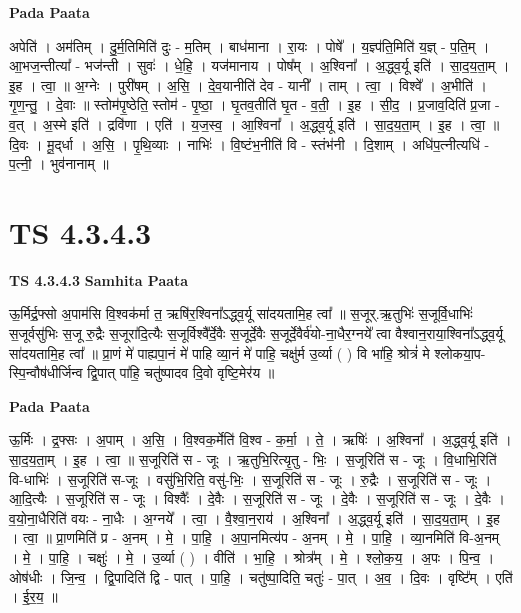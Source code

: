 \documentclass[17pt]{extarticle}
\begin{document}
\textbf{Pada Paata} \newline

अपेति॑ । अम॑तिम् । दु॒र्म॒तिमिति॑ दुः - म॒तिम् । बाध॑माना । रा॒यः । पोषे᳚ । य॒ज्ञ्प॑ति॒मिति॑ य॒ज्ञ् - प॒ति॒म् । आ॒भज॒न्तीत्या᳚ - भज॑न्ती । सुवः॑ । धे॒हि॒ । यज॑मानाय । पोष᳚म् । अ॒श्विना᳚ । अ॒द्ध्व॒र्यू इति॑ । सा॒द॒य॒ता॒म् । इ॒ह । त्वा॒ ॥ अ॒ग्नेः । पुरी॑षम् । अ॒सि॒ । दे॒व॒यानीति॑ देव - यानी᳚ । ताम् । त्वा॒ । विश्वे᳚ । अ॒भीति॑ । गृ॒ण॒न्तु॒ । दे॒वाः ॥ स्तोम॑पृ॒ष्ठेति॒ स्तोम॑ - पृ॒ष्ठा॒ । घृ॒तव॒तीति॑ घृ॒त - व॒ती॒ । इ॒ह । सी॒द॒ । प्र॒जाव॒दिति॑ प्र॒जा - व॒त् । अ॒स्मे इति॑ । द्रवि॑णा । एति॑ । य॒ज॒स्व॒ । आ॒श्विना᳚ । अ॒द्ध्व॒र्यू इति॑ । सा॒द॒य॒ता॒म् । इ॒ह । त्वा॒ ॥ दि॒वः । मू॒द्‌र्धा । अ॒सि॒ । पृ॒थि॒व्याः । नाभिः॑ । वि॒ष्टंभ॒नीति॑ वि - स्तंभ॑नी । दि॒शाम् । अधि॑प॒त्नीत्यधि॑ - प॒त्नी॒ । भुव॑नानाम् ॥  \newline




\section*{ TS 4.3.4.3 }

\textbf{TS 4.3.4.3 } \newline
\textbf{Samhita Paata} \newline

ऊ॒र्मिर्द्र॒फ्सो अ॒पाम॑सि वि॒श्वक॑र्मा त॒ ऋषि॑र॒श्विना᳚ऽद्ध्व॒र्यू सा॑दयतामि॒ह त्वा᳚ ॥ स॒जूर्.ऋ॒तुभिः॑ स॒जूर्वि॒धाभिः॑ स॒जूर्वसु॑भिः स॒जू रु॒द्रैः स॒जूरा॑दि॒त्यैः स॒जूर्विश्वै᳚र्दे॒वैः स॒जूर्दे॒वैः स॒जूर्दे॒वैर्व॑यो-ना॒धैर॒ग्नये᳚ त्वा वैश्वान॒राया॒श्विना᳚ऽद्ध्व॒र्यू सा॑दयतामि॒ह त्वा᳚ ॥ प्रा॒णं मे॑ पाह्यपा॒नं मे॑ पाहि व्या॒नं मे॑ पाहि॒ चक्षु॑र्म उ॒र्व्या ( ) वि भा॑हि॒ श्रोत्रं॑ मे श्लोकया॒प-स्पि॒न्वौष॑धीर्जिन्व द्वि॒पात् पा॑हि॒ चतु॑ष्पादव दि॒वो वृष्टि॒मेर॑य ॥ \newline

\textbf{Pada Paata} \newline

ऊ॒र्मिः । द्र॒फ्सः । अ॒पाम् । अ॒सि॒ । वि॒श्वक॒र्मेति॑ वि॒श्व - क॒र्मा॒ । ते॒ । ऋषिः॑ । अ॒श्विना᳚ । अ॒द्ध्व॒र्यू इति॑ । सा॒द॒य॒ता॒म् । इ॒ह । त्वा॒ ॥ स॒जूरिति॑ स - जूः । ऋ॒तुभि॒रित्यृ॒तु - भिः॒ । स॒जूरिति॑ स - जूः । वि॒धाभि॒रिति॑ वि-धाभिः॑ । स॒जूरिति॑ स-जूः । वसु॑भि॒रिति॒ वसु॑-भिः॒ । स॒जूरिति॑ स - जूः । रु॒द्रैः । स॒जूरिति॑ स - जूः । आ॒दि॒त्यैः । स॒जूरिति॑ स - जूः । विश्वैः᳚ । दे॒वैः । स॒जूरिति॑ स - जूः । दे॒वैः । स॒जूरिति॑ स - जूः । दे॒वैः । व॒यो॒ना॒धैरिति॑ वयः - ना॒धैः । अ॒ग्नये᳚ । त्वा॒ । वै॒श्वा॒न॒राय॑ । अ॒श्विना᳚ । अ॒द्ध्व॒र्यू इति॑ । सा॒द॒य॒ता॒म् । इ॒ह । त्वा॒ ॥ प्रा॒णमिति॑ प्र - अ॒नम् । मे॒ । पा॒हि॒ । अ॒पा॒नमित्य॑प - अ॒नम् । मे॒ । पा॒हि॒ । व्या॒नमिति॑ वि-अ॒नम् । मे॒ । पा॒हि॒ । चक्षुः॑ । मे॒ । उ॒र्व्या ( ) । वीति॑ । भा॒हि॒ । श्रोत्र᳚म् । मे॒ । श्लो॒क॒य॒ । अ॒पः । पि॒न्व॒ । ओष॑धीः । जि॒न्व॒ । द्वि॒पादिति॑ द्वि - पात् । पा॒हि॒ । चतु॑ष्पा॒दिति॒ चतुः॑ - पा॒त् । अ॒व॒ । दि॒वः । वृष्टि᳚म् । एति॑ । ई॒र॒य॒ ॥  \newline
\end{document}
